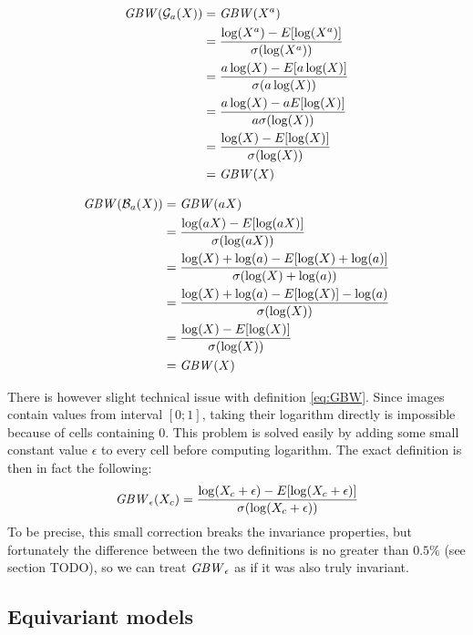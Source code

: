 \begin{align*}
    \mathit{GBW}(\mathcal{G}_a(X)) &=
    \mathit{GBW}(X^a) \\
    &= \frac{\log(X^a)-E[\log(X^a)]}{\sigma(\log(X^a))} \\
    &= \frac{a\log(X)-E[a\log(X)]}{\sigma(a\log(X))} \\
    &= \frac{a\log(X)-aE[\log(X)]}{a\sigma(\log(X))} \\
    &= \frac{\log(X)-E[\log(X)]}{\sigma(\log(X))} \\
    &= \mathit{GBW}(X)
\end{align*}

\begin{align*}
    \mathit{GBW}(\mathcal{B}_a(X)) &=
    \mathit{GBW}(aX) \\
    &= \frac{\log(aX)-E[\log(aX)]}{\sigma(\log(aX))} \\
    &= \frac{\log(X)+\log(a)-E[\log(X)+\log(a)]}{\sigma(\log(X)+\log(a))} \\
    &= \frac{\log(X)+\log(a)-E[\log(X)]-\log(a)}{\sigma(\log(X))} \\
    &= \frac{\log(X)-E[\log(X)]}{\sigma(\log(X))} \\
    &= \mathit{GBW}(X)
\end{align*}

There is however slight technical issue with definition \ref{eq:GBW}.
Since images contain values from interval $[0;1]$,
taking their logarithm directly is impossible because of
cells containing $0$. This problem is solved easily by adding some small constant value
$\epsilon$ to every cell before computing logarithm. The exact definition
is then in fact the following:
\begin{equation}
\mathit{GBW}_{\epsilon}(X_c) =
    \frac{\log(X_c+\epsilon)-E[\log(X_c+\epsilon)]}{\sigma(\log(X_c+\epsilon))}
\end{equation}
To be precise, this small correction breaks the invariance properties,
but fortunately the difference between the two definitions is no
greater than $0.5\%$ (see section TODO), so we
can treat $\mathit{GBW}_{\epsilon}$ as if it was also truly invariant.



\subsection{Equivariant models}
\label{sec:equ_models}

